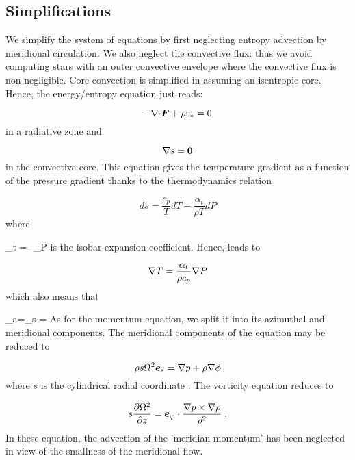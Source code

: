 \subsection{Simplifications}

We simplify the system of equations by first neglecting entropy
advection by meridional circulation. We also neglect the convective
flux: thus we avoid computing stars with an outer convective envelope
where the convective flux is non-negligible. Core convection is
simplified in assuming an isentropic core. Hence, the energy/entropy
equation just reads:

\begin{equation} -\Div\vF + \rho\eps_* = 0\end{equation}
in a radiative zone and

\begin{equation} \na s ={\vec 0}\label{nas}\end{equation}
in the convective core. This equation gives the temperature gradient as a function
of the pressure gradient thanks to the thermodynamics relation

\[ ds = \frac{c_p}{T}dT - \frac{\alpha_t}{\rho T}dP\]
where 

\beq \alpha_t = -\lp{}\rp_{\!\!P}
is the isobar expansion coefficient. Hence,  leads to

\begin{equation} \na T = \frac{\alpha_t}{\rho c_p}\na P\end{equation}
which also means that

\beq \nabla_a=\lp{}\rp_{\!\!s} =
As for the momentum equation, we split it into its azimuthal and
meridional components. The meridional components of the equation may be
reduced to

\begin{equation}
\rho s\Omega^2\es=\na p+\rho\na\phi
\label{baroc}
\end{equation}
where $s$ is the cylindrical radial coordinate \cite[e.g.][hereafter
referred to as ELR]{ELR13}. The vorticity equation reduces to

\begin{equation}
\label{eq:vort_inv}
s\frac{\partial\Omega^2}{\partial z}=\ephi\cdot\frac{\na
p\times\na\rho}{\rho^2} \;.
\end{equation}
In these equation, the advection of the 'meridian momentum' has been
neglected in view of the smallness of the meridional flow.

